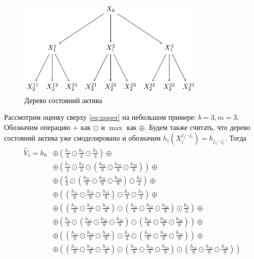\documentclass[specialist,
               substylefile = ../spbu.rtx,
               subf,href,colorlinks=true, 12pt]{disser}
\newcommand{\Vhat}{\hat{V}}
\begin{document}
	\begin{figure}[h]
	    \centering
		\includegraphics[width=0.8\textwidth]{exponential_tree.pdf}
		\caption{Дерево состояний актива}
		\label{fig:exponentialTree}
	\end{figure}

	Рассмотрим оценку сверху \eqref{eq:upper} на небольшом примере: $b = 3, m = 3$. Обозначим операцию $+$ как $\odot$ и $\max$ как $\oplus$. Будем также считать, что дерево состояний актива уже смоделировано и обозначим $h_i\left(X_i^{j_1\cdots j_i}\right) = h_{j_1\cdots j_i}$. Тогда
	\begin{align*}
		\Vhat_1 = h_0 &\oplus \left(\frac{h_{1}}{3}\odot\frac{h_{2}}{3}\odot\frac{h_{3}}{3}\right) \oplus \\ &\oplus\left(\frac{h_{1}}{3}\odot\frac{h_{2}}{3}\odot
					 \left(\frac{h_{31}}{9}\odot\frac{h_{32}}{9}\odot\frac{h_{33}}{9}\right)
					 \right)\oplus \\ 
		&\oplus \left(\frac{h_{}}{3}\odot
					 \left(\frac{h_{21}}{9}\odot\frac{h_{22}}{9}\odot\frac{h_{23}}{9}\right)
		\odot\frac{h_{3}}{3}\right) \oplus\\ 
		&\oplus \left(\left(\frac{h_{11}}{9}\odot\frac{h_{12}}{9}\odot\frac{h_{13}}{9}\right)\odot\frac{h_{2}}{3}\odot\frac{h_{3}}{3}\right) \oplus\\ 
		&\oplus \left(\left(\frac{h_{11}}{9}\odot\frac{h_{12}}{9}\odot\frac{h_{13}}{9}\right)\odot\left(\frac{h_{21}}{9}\odot\frac{h_{22}}{9}\odot\frac{h_{23}}{9}\right)\odot\frac{h_{3}}{3}\right) \oplus \\ 
		&\oplus \left(\frac{h_{1}}{3}\odot
					 \left(\frac{h_{21}}{9}\odot\frac{h_{22}}{9}\odot\frac{h_{23}}{9}\right)
					 \odot
					 \left(\frac{h_{31}}{9}\odot\frac{h_{32}}{9}\odot\frac{h_{33}}{9}\right)
				\right) \oplus \\ 
		&\oplus\left(
				\left(
					\frac{h_{11}}{9}\odot\frac{h_{12}}{9}\odot\frac{h_{13}}{9}
				\right)\odot\frac{h_{2}}{3}\odot\left(
					\frac{h_{31}}{9}\odot\frac{h_{32}}{9}\odot\frac{h_{33}}{9}
				\right)
			\right) \oplus \\ 
		&\oplus\left(\left(
					\frac{h_{11}}{9}\odot\frac{h_{12}}{9}\odot\frac{h_{13}}{9}
				\right)\odot\left(
					\frac{h_{21}}{9}\odot\frac{h_{22}}{9}\odot\frac{h_{23}}{9}
				\right)\odot\left(
					\frac{h_{31}}{9}\odot\frac{h_{32}}{9}\odot\frac{h_{33}}{9}
				\right)
			\right)
	\end{align*}
\end{document}
